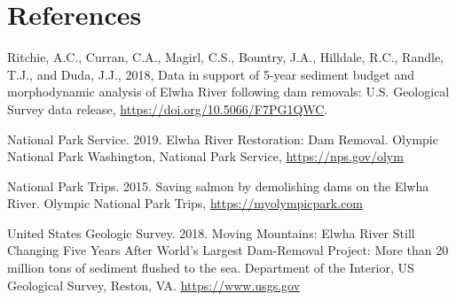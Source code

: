 \documentclass[12pt,]{article}
\begin{document}
\newpage

\hypertarget{references}{%
\section{References}\label{references}}

Ritchie, A.C., Curran, C.A., Magirl, C.S., Bountry, J.A., Hilldale,
R.C., Randle, T.J., and Duda, J.J., 2018, Data in support of 5-year
sediment budget and morphodynamic analysis of Elwha River following dam
removals: U.S. Geological Survey data release,
\url{https://doi.org/10.5066/F7PG1QWC}.

National Park Service. 2019. Elwha River Restoration: Dam Removal.
Olympic National Park Washington, National Park Service,
\url{https://nps.gov/olym}

National Park Trips. 2015. Saving salmon by demolishing dams on the
Elwha River. Olympic National Park Trips,
\url{https://myolympicpark.com}

United States Geologic Survey. 2018. Moving Mountains: Elwha River Still
Changing Five Years After World's Largest Dam-Removal Project: More than
20 million tons of sediment flushed to the sea. Department of the
Interior, US Geological Survey, Reston, VA. \url{https://www.usgs.gov}
\end{document}
